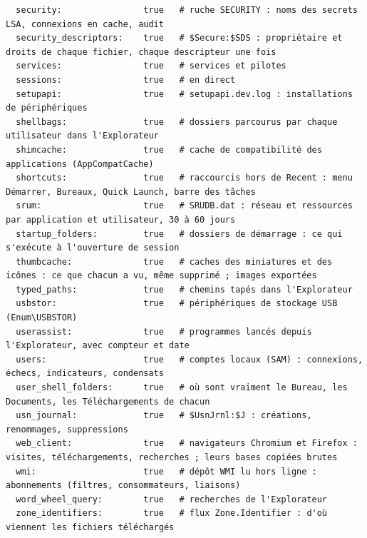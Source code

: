\documentclass[11pt,a4paper,oneside]{report}
\begin{document}
\begin{lstlisting}
  security:                true   # ruche SECURITY : noms des secrets LSA, connexions en cache, audit
  security_descriptors:    true   # $Secure:$SDS : propriétaire et droits de chaque fichier, chaque descripteur une fois
  services:                true   # services et pilotes
  sessions:                true   # en direct
  setupapi:                true   # setupapi.dev.log : installations de périphériques
  shellbags:               true   # dossiers parcourus par chaque utilisateur dans l'Explorateur
  shimcache:               true   # cache de compatibilité des applications (AppCompatCache)
  shortcuts:               true   # raccourcis hors de Recent : menu Démarrer, Bureaux, Quick Launch, barre des tâches
  srum:                    true   # SRUDB.dat : réseau et ressources par application et utilisateur, 30 à 60 jours
  startup_folders:         true   # dossiers de démarrage : ce qui s'exécute à l'ouverture de session
  thumbcache:              true   # caches des miniatures et des icônes : ce que chacun a vu, même supprimé ; images exportées
  typed_paths:             true   # chemins tapés dans l'Explorateur
  usbstor:                 true   # périphériques de stockage USB (Enum\USBSTOR)
  userassist:              true   # programmes lancés depuis l'Explorateur, avec compteur et date
  users:                   true   # comptes locaux (SAM) : connexions, échecs, indicateurs, condensats
  user_shell_folders:      true   # où sont vraiment le Bureau, les Documents, les Téléchargements de chacun
  usn_journal:             true   # $UsnJrnl:$J : créations, renommages, suppressions
  web_client:              true   # navigateurs Chromium et Firefox : visites, téléchargements, recherches ; leurs bases copiées brutes
  wmi:                     true   # dépôt WMI lu hors ligne : abonnements (filtres, consommateurs, liaisons)
  word_wheel_query:        true   # recherches de l'Explorateur
  zone_identifiers:        true   # flux Zone.Identifier : d'où viennent les fichiers téléchargés
\end{lstlisting}
\end{document}
